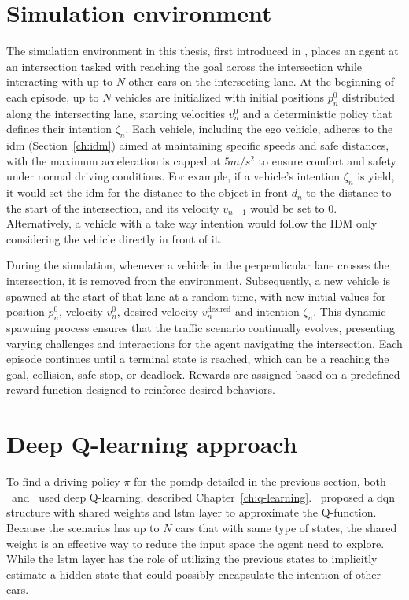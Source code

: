 \section{Simulation environment}
\label{ch:simulation_env}
The simulation environment in this thesis, first introduced in \paperLSTM, places an agent at an intersection tasked with reaching the goal across the intersection while interacting with up to $N$ other cars on the intersecting lane. At the beginning of each episode, up to $N$ vehicles are initialized with initial positions $p_n^0$ distributed along the intersecting lane, starting velocities $v_n^0$ and a deterministic policy that defines their intention $\zeta_n$. 
Each vehicle, including the ego vehicle, adheres to the \gls{idm} (Section~\ref{ch:idm}) aimed at maintaining specific speeds and safe distances, with the maximum acceleration is capped at $5 m/s^2$ to ensure comfort and safety under normal driving conditions.
For example, if a vehicle's intention $\zeta_n$ is yield, it would set the \gls{idm} for the distance to the object in front  $d_n$ to the distance to the start of the intersection, and its velocity $v_{n-1}$ would be set to $0$. Alternatively, a vehicle with a take way intention would follow the IDM only considering the vehicle directly in front of it.

During the simulation, whenever a vehicle in the perpendicular lane crosses the intersection, it is removed from the environment. Subsequently, a new vehicle is spawned at the start of that lane at a random time, with new initial values for position $p_n^0$, velocity $v_n^0$, desired velocity $v^\mathrm{desired}_n$ and intention $\zeta_n$. 
This dynamic spawning process ensures that the traffic scenario continually evolves, presenting varying challenges and interactions for the agent navigating the intersection.
Each episode continues until a terminal state is reached, which can be a reaching the goal, collision, safe stop, or deadlock. Rewards are assigned based on a predefined reward function designed to reinforce desired behaviors.


\section{Deep Q-learning approach}
To find a driving policy $\pi$ for the \gls{pomdp} detailed in the previous section, both \paperLSTM \ and \paperMPC \ used deep Q-learning, described Chapter~\ref{ch:q-learning}. \paperLSTM \ proposed a \gls{dqn} structure with shared weights and \gls{lstm} layer to approximate the Q-function. Because the scenarios has up to $N$ cars that with same type of states, the shared weight is an effective way to reduce the input space the agent need to explore. While the \gls{lstm} layer has the role of utilizing the previous states to implicitly estimate a hidden state that could possibly encapsulate the intention of other cars.

